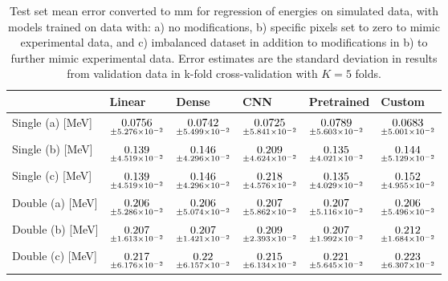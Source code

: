 \begin{table}
\centering
\caption{
Test set mean error converted to mm for regression of energies on simulated data, with models trained on data with: 
a) no modifications, b) specific pixels set to zero to mimic experimental data, and c) imbalanced dataset
in addition to modifications in b) to further mimic experimental data. Error estimates are the standard deviation 
in results from validation data in k-fold cross-validation with $K=5$ folds.
}
\label{tab:regression-simulated-all-energies-r2}
\begin{tabular}{llllll}
\toprule
{} &                                               Linear &                                                Dense &                                                  CNN &                                           Pretrained &                                               Custom \\
\midrule
Single (a) [MeV] &  $\underset{\num{+- 5.276e-02 }  }{\num{ 0.0756 } }$ &  $\underset{\num{+- 5.499e-02 }  }{\num{ 0.0742 } }$ &  $\underset{\num{+- 5.841e-02 }  }{\num{ 0.0725 } }$ &  $\underset{\num{+- 5.603e-02 }  }{\num{ 0.0789 } }$ &  $\underset{\num{+- 5.001e-02 }  }{\num{ 0.0683 } }$ \\
Single (b) [MeV] &  $\underset{\num{+- 4.519e-02 }  }{\num{ 0.139 } }$ &  $\underset{\num{+- 4.296e-02 }  }{\num{ 0.146 } }$ &  $\underset{\num{+- 4.624e-02 }  }{\num{ 0.209 } }$ &  $\underset{\num{+- 4.021e-02 }  }{\num{ 0.135 } }$ &  $\underset{\num{+- 5.129e-02 }  }{\num{ 0.144 } }$ \\
Single (c) [MeV] &  $\underset{\num{+- 4.519e-02 }  }{\num{ 0.139 } }$ &  $\underset{\num{+- 4.296e-02 }  }{\num{ 0.146 } }$ &  $\underset{\num{+- 4.576e-02 }  }{\num{ 0.218 } }$ &  $\underset{\num{+- 4.029e-02 }  }{\num{ 0.135 } }$ &  $\underset{\num{+- 4.955e-02 }  }{\num{ 0.152 } }$ \\
Double (a) [MeV] &  $\underset{\num{+- 5.286e-02 }  }{\num{ 0.206 } }$ &  $\underset{\num{+- 5.074e-02 }  }{\num{ 0.206 } }$ &  $\underset{\num{+- 5.862e-02 }  }{\num{ 0.207 } }$ &  $\underset{\num{+- 5.116e-02 }  }{\num{ 0.207 } }$ &  $\underset{\num{+- 5.496e-02 }  }{\num{ 0.206 } }$ \\
Double (b) [MeV] &  $\underset{\num{+- 1.613e-02 }  }{\num{ 0.207 } }$ &  $\underset{\num{+- 1.421e-02 }  }{\num{ 0.207 } }$ &  $\underset{\num{+- 2.393e-02 }  }{\num{ 0.209 } }$ &  $\underset{\num{+- 1.992e-02 }  }{\num{ 0.207 } }$ &  $\underset{\num{+- 1.684e-02 }  }{\num{ 0.212 } }$ \\
Double (c) [MeV] &  $\underset{\num{+- 6.176e-02 }  }{\num{ 0.217 } }$ &  $\underset{\num{+- 6.157e-02 }  }{\num{ 0.22 } }$ &  $\underset{\num{+- 6.134e-02 }  }{\num{ 0.215 } }$ &  $\underset{\num{+- 5.645e-02 }  }{\num{ 0.221 } }$ &  $\underset{\num{+- 6.307e-02 }  }{\num{ 0.223 } }$ \\
\bottomrule
\end{tabular}
\end{table}

